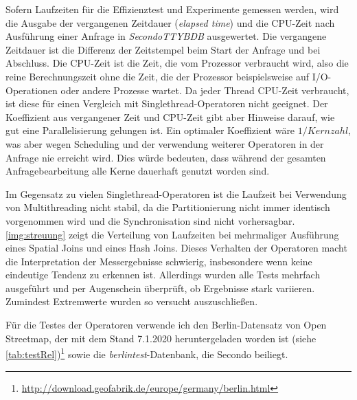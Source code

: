 \documentclass[a4paper,12pt,twoside]{article}
\newcommand{\Fb}[1]{\textit{#1}} %
\begin{document}
{Sofern Laufzeiten für die Effizienztest und Experimente gemessen werden, wird die Ausgabe der vergangenen Zeitdauer (\Fb{elapsed time}) und die CPU-Zeit nach Ausführung einer Anfrage in \Fb{SecondoTTYBDB} ausgewertet. Die vergangene Zeitdauer ist die Differenz der Zeitstempel beim Start der Anfrage und bei Abschluss. Die CPU-Zeit ist die Zeit, die vom Prozessor verbraucht wird, also die reine Berechnungszeit ohne die Zeit, die der Prozessor beispielsweise auf I/O-Operationen oder andere Prozesse wartet. Da jeder Thread CPU-Zeit verbraucht, ist diese für einen Vergleich mit Singlethread-Operatoren nicht geeignet. Der Koeffizient aus vergangener Zeit und CPU-Zeit gibt aber Hinweise darauf, wie gut eine Parallelisierung gelungen ist. Ein optimaler Koeffizient wäre $1 / Kernzahl$, was aber wegen Scheduling und der verwendung weiterer Operatoren in der Anfrage nie erreicht wird. Dies würde bedeuten, dass während der gesamten Anfragebearbeitung alle Kerne dauerhaft genutzt worden sind.

Im Gegensatz zu vielen Singlethread-Operatoren ist die Laufzeit bei Verwendung von Multithreading nicht stabil, da die Partitionierung nicht immer identisch vorgenommen wird und die Synchronisation sind nicht vorhersagbar. \autoref{img:streuung} zeigt die Verteilung von Laufzeiten bei mehrmaliger Ausführung eines Spatial Joins und eines Hash Joins. Dieses Verhalten der Operatoren macht die Interpretation der Messergebnisse schwierig, insbesondere wenn keine eindeutige Tendenz zu erkennen ist. Allerdings wurden alle Tests mehrfach ausgeführt und per Augenschein überprüft, ob Ergebnisse stark variieren. Zumindest Extremwerte wurden so versucht auszuschließen.  

Für die Testes der Operatoren verwende ich den Berlin-Datensatz von Open Streetmap, der mit dem Stand 7.1.2020 heruntergeladen worden ist (siehe \autoref{tab:testRel})\footnote{\url{http://download.geofabrik.de/europe/germany/berlin.html}} sowie die \Fb{berlintest}-Datenbank, die Secondo beiliegt.

}
\end{document}

